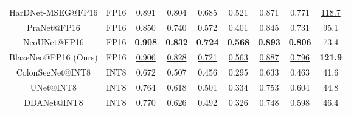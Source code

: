 \documentclass{ieeeaccess}
\newcommand{\ModelName}{BlazeNeo\xspace}
\begin{document}
\begin{table*}[ht!]
\begin{tabular}{@{} c | c | c c c c c c | c @{}}
        HarDNet-MSEG@FP16           & FP16                             & 0.891                                   & 0.804                                  & 0.685                                   & 0.521                                  & 0.871                                   & 0.771                                   & \underline{118.7}       \\
        PraNet@FP16                 & FP16                             & 0.850                                   & 0.740                                  & 0.572                                   & 0.401                                  & 0.845                                   & 0.731                                   & 95.1                    \\
        NeoUNet@FP16                & FP16                             & \textbf{0.908}                          & \textbf{0.832}                         & \textbf{0.724}                          & \textbf{0.568}                         & \textbf{0.893}                          & \textbf{0.806}                          & 73.4                    \\
        \ModelName{}@FP16 (Ours)    & FP16                             & \underline{0.906}                       & \underline{0.828}                      & \underline{0.721}                       & \underline{0.563}                      & \underline{0.887}                       & \underline{0.796}                       & \textbf{121.9}          \\
        \midrule
        ColonSegNet@INT8            & INT8                             & 0.672                                   & 0.507                                  & 0.456                                   & 0.295                                  & 0.633                                   & 0.463                                   & 41.6                    \\
        UNet@INT8                   & INT8                             & 0.764                                   & 0.618                                  & 0.501                                   & 0.334                                  & 0.753                                   & 0.604                                   & 44.8                    \\
        DDANet@INT8                 & INT8                             & 0.770                                   & 0.626                                  & 0.492                                   & 0.326                                  & 0.748                                   & 0.598                                   & 46.4                    \\

\end{tabular}
\end{table*}
\end{document}

